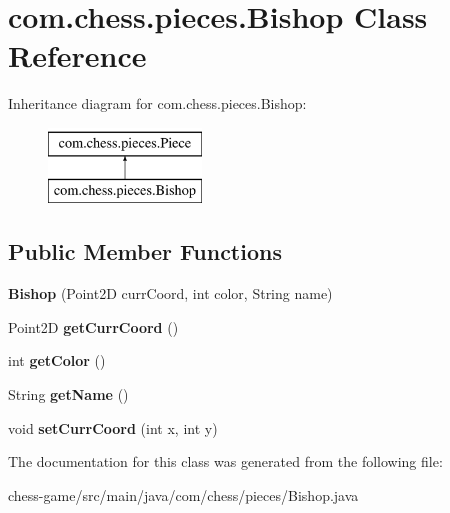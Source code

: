\hypertarget{classcom_1_1chess_1_1pieces_1_1_bishop}{}\section{com.\+chess.\+pieces.\+Bishop Class Reference}
\label{classcom_1_1chess_1_1pieces_1_1_bishop}
Inheritance diagram for com.\+chess.\+pieces.\+Bishop\+:\begin{figure}[H]
\begin{center}
\leavevmode
\includegraphics[height=2.000000cm]{classcom_1_1chess_1_1pieces_1_1_bishop}
\end{center}
\end{figure}
\subsection*{Public Member Functions}
\begin{DoxyCompactItemize}
\item 
\mbox{\label{classcom_1_1chess_1_1pieces_1_1_bishop_afcfe300df2e66019506be96829e04ab4}} 
{\bfseries Bishop} (Point2D curr\+Coord, int color, String name)
\item 
\mbox{\label{classcom_1_1chess_1_1pieces_1_1_bishop_abe24780d9afde570d688eb9e06ee94d3}} 
Point2D {\bfseries get\+Curr\+Coord} ()
\item 
\mbox{\label{classcom_1_1chess_1_1pieces_1_1_bishop_a2075e56cea3b527ee4ace3b0ce96ed83}} 
int {\bfseries get\+Color} ()
\item 
\mbox{\label{classcom_1_1chess_1_1pieces_1_1_bishop_adff3e3ebf3793d097df483ddc89e2e5b}} 
String {\bfseries get\+Name} ()
\item 
\mbox{\label{classcom_1_1chess_1_1pieces_1_1_bishop_a3c49424948942e9e44acbb99269779fa}} 
void {\bfseries set\+Curr\+Coord} (int x, int y)
\end{DoxyCompactItemize}


The documentation for this class was generated from the following file\+:\begin{DoxyCompactItemize}
\item 
chess-\/game/src/main/java/com/chess/pieces/Bishop.\+java\end{DoxyCompactItemize}

